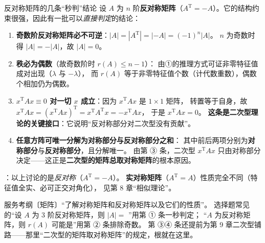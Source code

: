 \begin{fdeep}{反对称矩阵的几条“秒判”结论}
设 $A$ 为 $n$ 阶\textbf{反对称矩阵}（$A^{\mathrm{T}}=-A$）。它的结构约束很强，因此有一批可以\emph{直接判定}的结论：

\begin{enumerate}[leftmargin=2.2em,itemsep=0.25em]
\item \textbf{奇数阶反对称矩阵必不可逆}：$|A|=|A^{\mathrm{T}}|=|-A|=(-1)^{n}|A|$。
      $n$ 为奇数时得 $|A|=-|A|$，故 $|A|=0$。
\item \textbf{秩必为偶数}（故奇数阶时 $r(A)\le n-1$）：
      由①的推理方式可证非零特征值成对出现（$\lambda$ 与 $-\lambda$），
      而 $r(A)$ 等于非零特征值个数（计代数重数），偶数个相加仍为偶数。
\item \textbf{$x^{\mathrm{T}}Ax\equiv0$ 对一切 $x$ 成立}：因为 $x^{\mathrm{T}}Ax$ 是 $1\times1$ 矩阵，
      转置等于自身，故 $x^{\mathrm{T}}Ax=(x^{\mathrm{T}}Ax)^{\mathrm{T}}=x^{\mathrm{T}}A^{\mathrm{T}}x=-x^{\mathrm{T}}Ax$，
      于是 $x^{\mathrm{T}}Ax=0$。
      \textbf{这条是二次型理论的关键接口}：它说明“反对称部分对二次型没有贡献”。
\item \textbf{任意方阵可唯一分解为对称部分与反对称部分之和}：
      其中前后两项分别为\textbf{对称部分}与\textbf{反对称部分}，且分解唯一。
      由第 ③ 条，二次型 $x^{\mathrm{T}}Ax$ 只由对称部分决定——这正是\textbf{二次型的矩阵总取对称矩阵}的根本原因。
\end{enumerate}
：以上讨论的是\emph{反对称}（$A^{\mathrm{T}}=-A$）。
\textbf{实对称矩阵}（$A^{\mathrm{T}}=A$）性质完全不同（特征值全实、必可正交对角化），
见第 8 章“相似理论”。

\fbref{}服务考纲〔矩阵〕“了解对称矩阵和反对称矩阵以及它们的性质”。
选择题常见的“设 $A$ 为 3 阶反对称矩阵，则 $|A|=$ \underline{\hspace{2em}}”用第 ① 条一秒判定；
“$A$ 为反对称矩阵，则 $r(A)$ 可能是”用第 ② 条排除奇数。
第 ③④ 条还提前为第 9 章二次型铺路——那里“二次型的矩阵取对称矩阵”的规定，根就在这里。
\end{fdeep}



